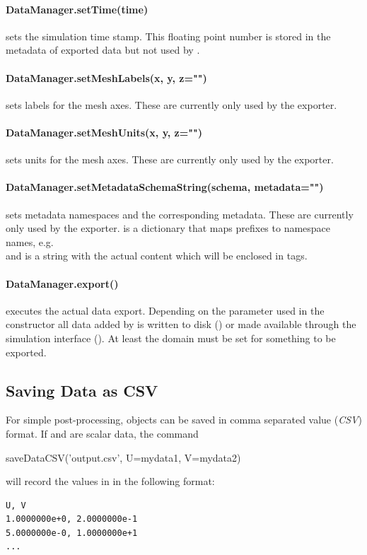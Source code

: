 \paragraph{DataManager.setTime(time)}
sets the simulation time stamp. This floating point number is stored in
    the metadata of exported data but not used by .


\paragraph{DataManager.setMeshLabels(x, y, z="")}
sets labels for the mesh axes. These are currently only used by the \SILO
    exporter.


\paragraph{DataManager.setMeshUnits(x, y, z="")}
sets units for the mesh axes. These are currently only used by the \SILO
    exporter.


\paragraph{DataManager.setMetadataSchemaString(schema, metadata="")}
sets metadata namespaces and the corresponding metadata. These are
    currently only used by the \VTK exporter.
     is a dictionary that maps prefixes to namespace names, e.g.\\
     and  is a
    string with the actual content which will be enclosed in 
    tags.


\paragraph{DataManager.export()}
executes the actual data export. Depending on the  parameter
    used in the constructor all data added by  is written to
    disk () or made available through the \VisIt
    simulation interface ().
    At least the domain must be set for something to be exported.


\subsection{Saving Data as CSV}
\label{sec:savedatacsv}
For simple post-processing, \Data objects can be saved in comma separated
value (\emph{CSV}) format.
If  and  are scalar data, the command
\begin{python}
  saveDataCSV('output.csv', U=mydata1, V=mydata2)
\end{python}
will record the values in  in the following format:
\begin{verbatim}
U, V
1.0000000e+0, 2.0000000e-1
5.0000000e-0, 1.0000000e+1
...
\end{verbatim}

